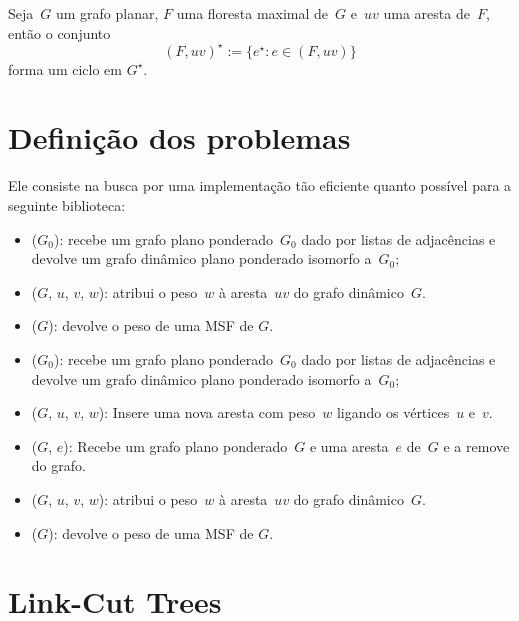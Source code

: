 \begin{theorem}
\label{teo:cutset}
Seja~$G$ um grafo planar, $F$ uma floresta maximal de~$G$ e~$uv$ uma aresta de~$F$, então o conjunto
$$
(F, uv)^\star := \{e^\star:e\in (F, uv)\}
$$
forma um ciclo em $G^\star$.
\end{theorem}


\section{Definição dos problemas}

Ele consiste na busca por uma implementação tão eficiente quanto possível para a seguinte biblioteca:

\begin{itemize}
\item \MSFCreate($G_0$): recebe um grafo plano ponderado~$G_0$ dado por listas de adjacências e devolve um grafo dinâmico plano ponderado isomorfo a~$G_0$; 
\item \MSFupdate($G$, $u$, $v$, $w$): atribui o peso~$w$ à aresta~$uv$ do grafo dinâmico~$G$.
\item \MSFweight($G$): devolve o peso de uma MSF de $G$.
\end{itemize}




\begin{itemize}
\item \MSFCreate($G_0$): recebe um grafo plano ponderado~$G_0$ dado por listas de adjacências e devolve um grafo dinâmico plano ponderado isomorfo a~$G_0$; 
\item \MSFaddEdge($G$, $u$, $v$, $w$): Insere uma nova aresta com peso~$w$ ligando os vértices~$u$ e~$v$.
\item \MSFdelEdge($G$, $e$): Recebe um grafo plano ponderado~$G$ e uma aresta~$e$ de~$G$ e a remove do grafo.
\item \MSFupdate($G$, $u$, $v$, $w$): atribui o peso~$w$ à aresta~$uv$ do grafo dinâmico~$G$.
\item \MSFweight($G$): devolve o peso de uma MSF de $G$.
\end{itemize}

\section{Link-Cut Trees}
\label{sec:linkcuttree}


